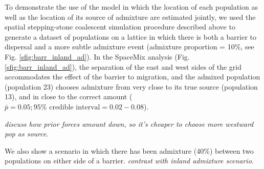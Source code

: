 \documentclass[12pt]{article}
\newcommand{\gb}[1]{{\em \color{magenta} #1}}
\begin{document}
To demonstrate the use of the model in which the location of each population as well as the location of its source of admixture are estimated jointly, we used the spatial stepping-stone coalescent simulation procedure described above to generate a dataset of populations on a lattice in which there is both a barrier to dispersal and a more subtle admixture event (admixture proportion = 10\%, see Fig. \ref{sfig:barr_inland_ad}).  In the SpaceMix analysis (Fig. \ref{sfig:barr_inland_ad}), the separation of the east and west sides of the grid accommodates the effect of the barrier to migration, and the admixed population (population 23) chooses admixture from very close to its true source (population 13), and in close to the correct amount ($\bar{p} = 0.05; 95\% \text{ credible interval} = 0.02-0.08$). 

\gb{discuss how prior forces amount down, so it's cheaper to choose more westward pop as source}.

We also show a scenario in which there has been admixture (40\%) between two populations on either side of a barrier.  \gb{contrast with inland admixture scenario}.
\end{document}
